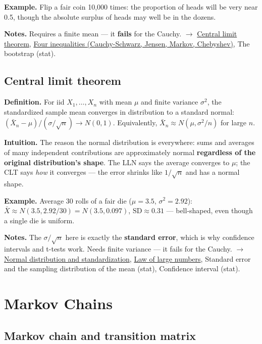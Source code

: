 \documentclass[11pt,a4paper]{article}
\begin{document}
\textbf{Example.} Flip a fair coin 10,000 times: the proportion of heads will be very near 0.5, though the absolute surplus of heads may well be in the dozens.

\textbf{Notes.} Requires a finite mean --- it \textbf{fails} for the Cauchy. $\to$ \hyperref[sec:central-limit-theorem]{Central limit theorem}, \hyperref[sec:four-inequalities-cauchy-schwarz-jensen-markov-chebyshev]{Four inequalities (Cauchy-Schwarz, Jensen, Markov, Chebyshev)}, The bootstrap (stat).

\subsection{Central limit theorem}\label{sec:central-limit-theorem}

\textbf{Definition.} For iid $X_{1}, \ldots , X_{n}$ with mean $\mu$ and finite variance $\sigma ^{2}$, the standardized sample mean converges in distribution to a standard normal:
$(\bar{X}_{n} - \mu ) / (\sigma /\sqrt{n}) \to  N(0, 1)$. Equivalently, $\bar{X}_{n} \approx  N(\mu , \sigma ^{2}/n)$ for large $n$.

\textbf{Intuition.} The reason the normal distribution is everywhere: sums and averages of many independent contributions are approximately normal \textbf{regardless of the original distribution's shape}. The LLN says the average converges to $\mu$; the CLT says \textit{how} it converges --- the error shrinks like $1/\sqrt{n}$ and has a normal shape.

\textbf{Example.} Average 30 rolls of a fair die ($\mu  = 3.5$, $\sigma ^{2} = 2.92$): $\bar{X} \approx  N(3.5, 2.92/30) = N(3.5, 0.097)$, $\mathrm{SD} \approx  0.31$ --- bell-shaped, even though a single die is uniform.

\textbf{Notes.} The $\sigma /\sqrt{n}$ here is exactly the \textbf{standard error}, which is why confidence intervals and t-tests work. Needs finite variance --- it fails for the Cauchy. $\to$ \hyperref[sec:normal-distribution-and-standardization]{Normal distribution and standardization}, \hyperref[sec:law-of-large-numbers]{Law of large numbers}, Standard error and the sampling distribution of the mean (stat), Confidence interval (stat).


\section{Markov Chains}

\subsection{Markov chain and transition matrix}\label{sec:markov-chain-and-transition-matrix}
\end{document}
